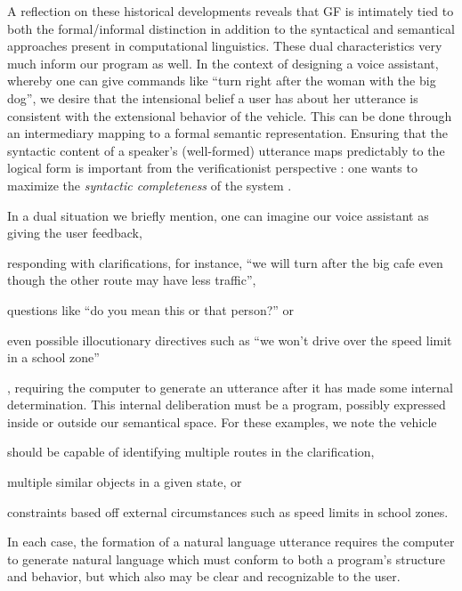 \documentclass{article}
\begin{document}
A reflection on these historical developments reveals that GF is intimately tied
to both the formal/informal distinction in addition to the syntactical and
semantical approaches present in computational linguistics. These dual
characteristics very much inform our program as well. In the context of
designing a voice assistant, whereby one can give commands like ``turn right
after the woman with the big dog'', we desire that the intensional belief a user
has about her utterance is consistent with the extensional behavior of the
vehicle. This can be done through an intermediary mapping to a formal semantic
representation. Ensuring that the syntactic content of a speaker's (well-formed)
utterance maps predictably to the logical form is important from the
verificationist perspective : one wants to maximize the \emph{syntactic
completeness} of the system \cite{macmillan2021}.

In a dual situation we briefly mention, one can imagine our voice assistant as
giving the user feedback,
\begin {enumerate*} [label=\itshape\alph*\upshape)]
\item responding with clarifications, for instance, ``we will turn after the big
cafe even though the other route may have less traffic'', \item questions like
``do you mean this or that person?'' or \item even possible illocutionary
directives such as ``we won't drive over the speed limit in a school zone''
\end{enumerate*}
, requiring the computer to generate an utterance after it has made some internal
determination. This internal deliberation must be a program, possibly expressed
inside or outside our semantical space. For these examples, we note the vehicle
\begin {enumerate*} [label=\itshape\alph*\upshape)]
\item should be capable of identifying multiple routes in the clarification,
\item multiple similar objects in a given state, or
\item constraints based off external circumstances
such as speed limits in school zones.
\end{enumerate*}
In each case, the formation of a natural
language utterance requires the computer to generate natural language which must
conform to both a program's structure and behavior, but which also may be clear
and recognizable to the user.
\end{document}
